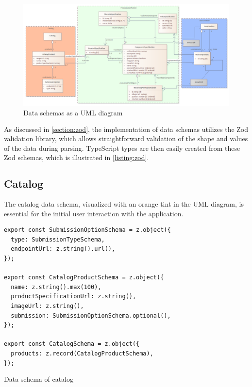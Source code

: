 \begin{landscape}
\begin{figure}[h]
\centering
\includegraphics[width=\linewidth]{images/uml_dataschema.png}
\caption{Data schemas as a UML diagram}
\label{fig:data-schema}
\end{figure}
\end{landscape}

As discussed in \autoref{section:zod}, the implementation of data schemas utilizes the Zod validation library, which allows straightforward validation of the shape and values of the data during parsing. TypeScript types are then easily created from these Zod schemas, which is illustrated in \autoref{listing:zod}. \cite{Wycliffe2023} 

\subsection{Catalog}

The catalog data schema, visualized with an orange tint in the UML diagram, is essential for the initial user interaction with the application.

\begin{listing}[h]
\begin{verbatim}
export const SubmissionOptionSchema = z.object({
  type: SubmissionTypeSchema,
  endpointUrl: z.string().url(),
});

export const CatalogProductSchema = z.object({
  name: z.string().max(100),
  productSpecificationUrl: z.string(),
  imageUrl: z.string(),
  submission: SubmissionOptionSchema.optional(),
});

export const CatalogSchema = z.object({
  products: z.record(CatalogProductSchema),
});
\end{verbatim}
\caption{Data schema of catalog}
\label{lisiting:schema-catalog}
\end{listing}

